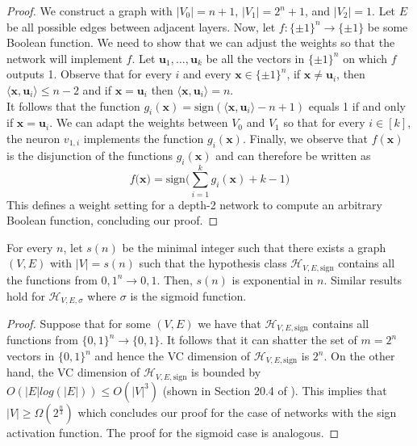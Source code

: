 \documentclass{article}
\begin{document}
\begin{proof}
We construct a graph with $|V_0| = n + 1$, $|V_1| = 2^n + 1$, and $|V_2| = 1$. Let $E$ be all possible edges between adjacent layers. Now, let $f: \{\pm 1\}^n \to \{\pm 1\}$ be some Boolean function. We need to show that we can adjust the weights so that the network will implement $f$. Let $\textbf{u}_1, \dots, \textbf{u}_k$ be all the vectors in $\{\pm 1\}^n$ on which $f$ outputs 1. Observe that for every $i$ and every $\textbf{x} \in \{ \pm 1\}^n$, if $\textbf{x} \neq \textbf{u}_i$, then $\langle\textbf{x}, \textbf{u}_i \rangle \leq n - 2$ and if $\textbf{x} = \textbf{u}_i$ then $\langle\textbf{x}, \textbf{u}_i \rangle = n$. \\

It follows that the function $g_i(\textbf{x}) = \text{sign}(\langle\textbf{x}, \textbf{u}_i \rangle - n + 1)$ equals 1 if and only if $\textbf{x} = \textbf{u}_i$. We can adapt the weights between $V_0$ and $V_1$ so that for every $i \in [k]$, the neuron $v_{1, i}$ implements the function $g_i(\textbf{x})$. Finally, we observe that $f(\textbf{x})$ is the disjunction of the functions $g_i(\textbf{x})$ and can therefore be written as $$f(\textbf{x)} = \text{sign} \bigg(\sum_{i=1}^k g_i(\textbf{x}) + k - 1 \bigg)$$
This defines a weight setting for a depth-2 network to compute an arbitrary Boolean function, concluding our proof.
\end{proof}

\begin{thm}
\label{thm:exponential}
For every $n$, let $s(n)$ be the minimal integer such that there exists a graph $(V, E)$ with $|V| = s(n)$ such that the hypothesis class $\mathcal{H}_{V,E,\text{sign}}$ contains all the functions from ${0, 1}^n \to {0, 1}$. Then, $s(n)$ is exponential in $n$. Similar results hold for $\mathcal{H}_{V,E,\sigma}$ where $\sigma$ is the sigmoid function.
\end{thm}

\begin{proof}
Suppose that for some $(V, E)$ we have that $\mathcal{H}_{V, E, \text{sign}}$ contains all functions from $\{0, 1\}^n \to \{0, 1\}$. It follows that it can shatter the set of $m = 2^n$ vectors in $\{0, 1\}^n$ and hence the VC dimension of $\mathcal{H}_{V, E, \text{sign}}$ is $2^n$. On the other hand, the VC dimension of $\mathcal{H}_{V, E, \text{sign}}$ is bounded by $O(|E|log(|E|)) \leq O(|V|^3)$ (shown in Section 20.4 of \citep{Shalev-Shwartz:2014:UML:2621980}). This implies that $|V| \geq \Omega(2^{\frac{n}{3}})$ which concludes our proof for the case of networks with the sign activation function. The proof for the sigmoid case is analogous.
\end{proof}
\end{document}
